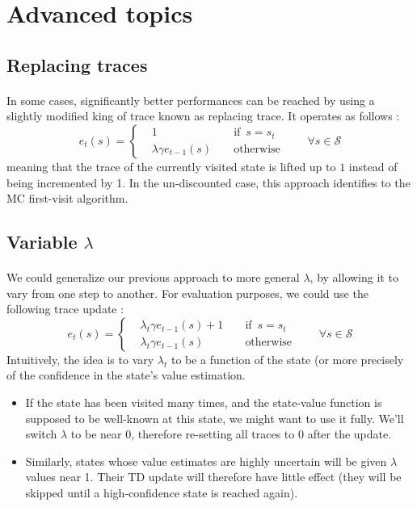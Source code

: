 \documentclass[a4paper]{article}
\newcommand\mS{\mathcal{S}}
\begin{document}
	\section{Advanced topics}
	{
		\subsection{Replacing traces}
		{
			\paragraph{} In some cases, significantly better performances can be reached by using a slightly modified king of trace known as replacing trace. It operates as follows : 
			\begin{equation}
				e_t(s) = 
					\left\{\begin{aligned}
						&1 &&\text{ if } \, s=s_t \\
						& \lambda \gamma e_{t-1}(s) &&\text{ otherwise}
					\end{aligned}\right. \qquad \forall s\in\mS
			\end{equation}
			meaning that the trace of the currently visited state is lifted up to $1$ instead of being incremented by 1. In the un-discounted case, this approach identifies to the MC first-visit algorithm. 
		}
		\subsection{Variable $\lambda$}
		{
			\paragraph{} We could generalize our previous approach to more general $\lambda$, by allowing it to vary from one step to another. For evaluation purposes, we could use the following trace update : 
			\begin{equation}
				e_{t}(s) = \left\{\begin{aligned}
						& \lambda_t \gamma e_{t-1}(s)  + 1 &&\text{ if } \, s=s_t \\
						& \lambda_t \gamma e_{t-1}(s) &&\text{ otherwise}
					\end{aligned}\right. \qquad \forall s\in\mS
			\end{equation}
			Intuitively, the idea is to vary $\lambda_t$ to be a function of the state (or more precisely of the confidence in the state's value estimation. 
			\begin{itemize}[label = $\color{red}\boldsymbol{\rightarrow}$]
				\item If the state has been visited many times, and the state-value function is supposed to be well-known at this state, we might want to use it fully. We'll switch $\lambda$ to be near $0$, therefore re-setting all traces to 0 after the update. 
				\item Similarly, states whose value estimates are highly uncertain will be given $\lambda$ values near 1. Their TD update will therefore have little effect (they will be skipped until a high-confidence state is reached again). 
			\end{itemize}
		}
	}
\end{document}
